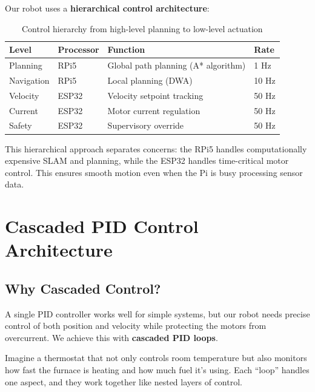 \documentclass[11pt,letterpaper]{article}
\begin{document}
Our robot uses a \textbf{hierarchical control architecture}:

\begin{table}[H]
\centering
\begin{tabular}{@{}llll@{}}
\toprule
\textbf{Level} & \textbf{Processor} & \textbf{Function} & \textbf{Rate} \\
\midrule
Planning & RPi5 & Global path planning (A* algorithm) & 1 Hz \\
Navigation & RPi5 & Local planning (DWA) & 10 Hz \\
Velocity & ESP32 & Velocity setpoint tracking & 50 Hz \\
Current & ESP32 & Motor current regulation & 50 Hz \\
Safety & ESP32 & Supervisory override & 50 Hz \\
\bottomrule
\end{tabular}
\caption{Control hierarchy from high-level planning to low-level actuation}
\end{table}

\begin{whymatters}
This hierarchical approach separates concerns: the RPi5 handles computationally expensive SLAM and planning, while the ESP32 handles time-critical motor control. This ensures smooth motion even when the Pi is busy processing sensor data.
\end{whymatters}

\newpage
\section{Cascaded PID Control Architecture}

\subsection{Why Cascaded Control?}

A single PID controller works well for simple systems, but our robot needs precise control of both position and velocity while protecting the motors from overcurrent. We achieve this with \textbf{cascaded PID loops}.

\begin{plainenglish}
Imagine a thermostat that not only controls room temperature but also monitors how fast the furnace is heating and how much fuel it's using. Each ``loop'' handles one aspect, and they work together like nested layers of control.
\end{plainenglish}
\end{document}
